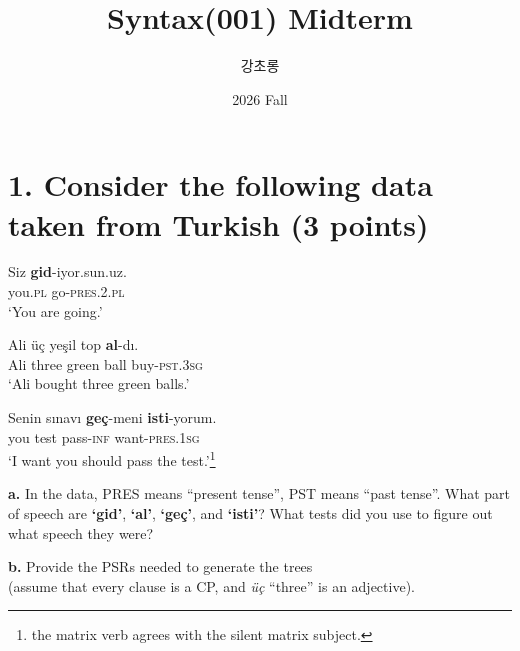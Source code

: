 \documentclass{article}
\newcommand{\glabbr}[1]{\textsc{\MakeLowercase{#1}}}
\begin{document}
\large

\title{Syntax(001) Midterm}
\author{강초롱}
\date{2026 Fall}
\maketitle
\thispagestyle{fancy}
\bigskip

\section{1. Consider the following data taken from Turkish \normalsize(3 points)}
\medskip 
\begin{exe}
  \ex
  \gll Siz \textbf{gid}-iyor.sun.uz.\\
       you.\glabbr{PL} go-\glabbr{PRES}.2.\glabbr{PL}\\
  \glt `You are going.'

  \ex
  \gll Ali \"{u}\c{c} ye\c{s}il top \textbf{al}-d\i.\\
       Ali three green ball buy-\glabbr{PST}.3\glabbr{SG}\\
  \glt `Ali bought three green balls.'

  \ex
  \gll Senin s\i{}nav\i{} \textbf{ge\c{c}}-meni
       \textbf{isti}-yorum.\\
       you test pass-\glabbr{INF} want-\glabbr{PRES}.1\glabbr{SG}\\
  \glt `I want you should pass the test.'\footnote{the matrix verb agrees with the silent matrix subject.}
\end{exe}
\bigskip
\noindent \textbf{a.} In the data, PRES means ``present tense'', PST means ``past tense''. 
What part of speech are \textbf{`gid'}, \textbf{`al'}, \textbf{`ge\c{c}'}, and \textbf{`isti'}? 
What tests did you use to figure out what speech they were? \par
\vspace{3cm}

\noindent \textbf{b.} Provide the PSRs needed to generate the trees \\(assume that every clause is a CP, and \textit{\"{u}\c{c}} ``three'' is an adjective). \par
\vspace{3cm}

\newpage
\end{document}

